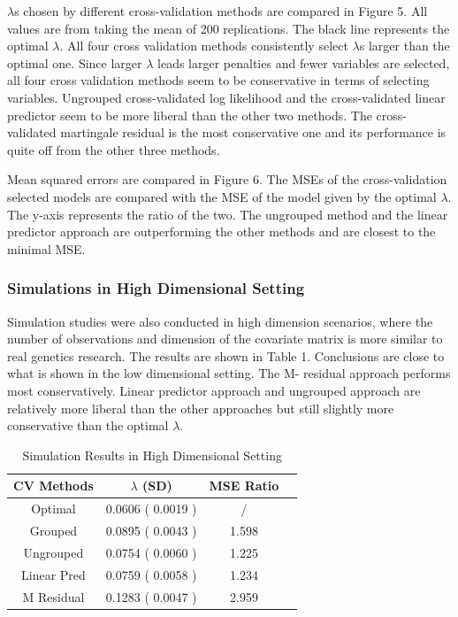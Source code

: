 \documentclass{article}\usepackage[]{graphicx}\usepackage[]{color}
\begin{document}
    $\lambda$s chosen by different cross-validation methods are compared in Figure 5. All values are from taking the mean of 200 replications. The black line represents the optimal $\lambda$. All four cross validation methods consistently select $\lambda$s larger than the optimal one. Since larger $\lambda$ leads larger penalties and fewer variables are selected, all four cross validation methods seem to be conservative in terms of selecting variables. Ungrouped cross-validated log likelihood and the cross-validated linear predictor seem to be more liberal than the other two methods. The cross-validated martingale residual is the most conservative one and its performance is quite off from the other three methods.

   Mean squared errors are compared in Figure 6. The MSEs of the cross-validation selected models are compared with the MSE of the model given by the optimal $\lambda$. The y-axis represents the ratio of the two. The ungrouped method and the linear predictor approach are outperforming the other methods and are closest to the minimal MSE.

    \subsubsection {Simulations in High Dimensional Setting}

   Simulation studies were also conducted in high dimension scenarios, where the number of observations and dimension of the covariate matrix is more similar to real genetics research. The results are shown in Table 1. Conclusions are close to what is shown in the low dimensional setting. The M- residual approach performs most conservatively. Linear predictor approach and ungrouped approach are relatively more liberal than the other approaches but still slightly more conservative than the optimal $\lambda$.
  
  \begin{table}[h]
    \centering
			\begin{tabular}{ c | c | c | c}
				CV Methods & $\lambda$ (SD) & MSE Ratio \\
				\hline \hline
				Optimal  & 0.0606 ( 0.0019 )&  / & \\ 
				Grouped  &  0.0895  ( 0.0043 )& 1.598  \\
				Ungrouped & 0.0754 ( 0.0060 )& 1.225 \\
				Linear Pred & 0.0759 ( 0.0058 )& 1.234 \\
				M Residual &0.1283 ( 0.0047 ) & 2.959
			\end{tabular}
			\caption{Simulation Results in High Dimensional Setting}
	\end{table}
  
\end{document}
